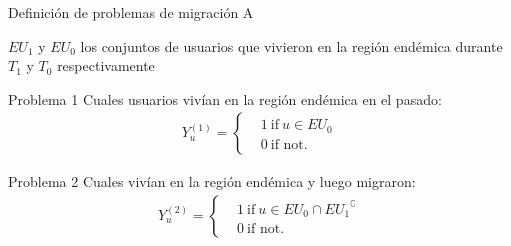 \documentclass[xcolor=x11names]{beamer}
\begin{document}

\begin{frame}{Definición de problemas de migración A}

	$EU_{1}$ y $EU_{0}$ los conjuntos de usuarios que vivieron en la región endémica durante $T_1$ y $T_0$ respectivamente
	\begin{block}{Problema 1}
	Cuales usuarios vivían en la región endémica en el pasado:
		\begin{align*}
		Y^{(1)}_u =
		\begin{cases}
		&1 \ \mbox{if} \ u \in EU_{0} \\
		&0 \ \mbox{if not}.
		\end{cases}
		\end{align*}
	\end{block}


	\begin{block}{Problema 2}
		Cuales vivían en la región endémica y luego migraron:
		\begin{align*}
			Y^{(2)}_u =
			\begin{cases}
				&1 \ \mbox{if} \ u \in EU_{0} \cap { EU_{1} }^{\complement}  \\
				&0 \ \mbox{if not}.
			\end{cases}
		\end{align*}
	\end{block}

\end{frame}

\end{document}

